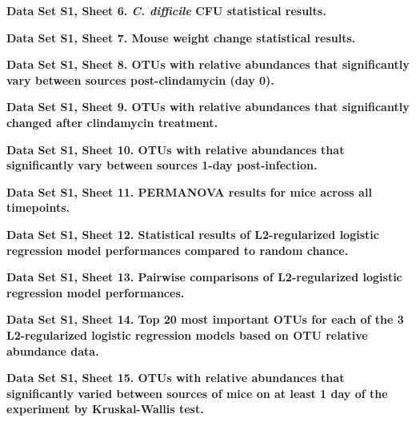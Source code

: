 \documentclass[
  11pt,
]{article}
\begin{document}
\textbf{Data Set S1, Sheet 6. \emph{C. difficile} CFU statistical
results.}

\textbf{Data Set S1, Sheet 7. Mouse weight change statistical results.}

\textbf{Data Set S1, Sheet 8. OTUs with relative abundances that
significantly vary between sources post-clindamycin (day 0).}

\textbf{Data Set S1, Sheet 9. OTUs with relative abundances that
significantly changed after clindamycin treatment.}

\textbf{Data Set S1, Sheet 10. OTUs with relative abundances that
significantly vary between sources 1-day post-infection.}

\textbf{Data Set S1, Sheet 11. PERMANOVA results for mice across all
timepoints.}

\textbf{Data Set S1, Sheet 12. Statistical results of L2-regularized
logistic regression model performances compared to random chance.}

\textbf{Data Set S1, Sheet 13. Pairwise comparisons of L2-regularized
logistic regression model performances.}

\textbf{Data Set S1, Sheet 14. Top 20 most important OTUs for each of
the 3 L2-regularized logistic regression models based on OTU relative
abundance data.}

\textbf{Data Set S1, Sheet 15. OTUs with relative abundances that
significantly varied between sources of mice on at least 1 day of the
experiment by Kruskal-Wallis test.}
\end{document}
